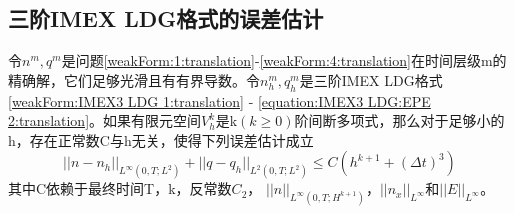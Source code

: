 \subsection{三阶IMEX LDG格式的误差估计}
\begin{theorem}
    令$n^m,q^m$是问题\eqref{weakForm:1:translation}-\eqref{weakForm:4:translation}在时间层级m的精确解，它们足够光滑且有有界导数。令$n_h^m,q_h^m$是三阶IMEX LDG格式\eqref{weakForm:IMEX3 LDG 1:translation} - \eqref{equation:IMEX3 LDG:EPE 2:translation}。如果有限元空间$V_h^k$是k$(k\geq  0)$阶间断多项式，那么对于足够小的h，存在正常数C与h无关，使得下列误差估计成立
    \begin{equation}
        ||n-n_h||_{L^{\infty}(0,T;L^2)} + ||q - q_h||_{L^2(0,T;L^2)} \leq C(h^{k+1} + (\Delta t)^3)
    \end{equation}
    其中C依赖于最终时间T，k，反常数$C_2$， $||n||_{L^{\infty}(0,T;H^{k+1})}$，$||n_x||_{L^{\infty}}$和$||E||_{L^{\infty}}$。
\end{theorem}
